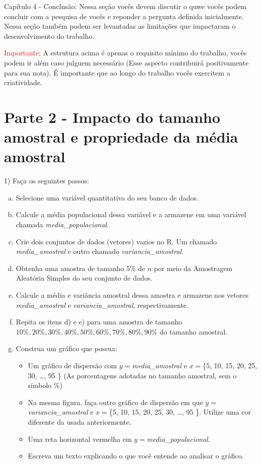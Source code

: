 \documentclass{article}
\begin{document}
Capítulo 4 - Conclusão: Nessa seção vocês devem discutir o quwe vocês podem concluir com a pesquisa de vocês e reponder a pergunta definida inicialmente. Nessa 
seção também podem ser levantadas as limitações que impactaram o desenvolvimento do trabalho. 



\textcolor{red}{Importante}: A estrutura acima é apenas o requisito mínimo do trabalho, vocês podem ir além caso julguem necessário (Esse aspecto contribuirá positivamente para sua nota).
É importante que ao longo do trabalho vocês exercitem a criatividade.


\section{Parte 2 - Impacto do tamanho amostral e propriedade da média amostral}

1) Faça os seguintes passos:
\begin{enumerate}[a)]
    \item Selecione uma variável quantitativa do seu banco de dados. 
    \item Calcule a média populacional dessa variável e a armazene em uma variável chamada \textit{media\_populacional}.
    \item Crie dois conjuntos de dados (vetores) vazios no R. Um chamado \textit{media\_amostral} e outro chamado  \textit{variancia\_amostral}.
    \item Obtenha uma amostra de tamanho $5\%$ de $n$ por meio da Amostragem Aleatória Simples do seu conjunto de dados. 
    \item Calcule a média e variância amostral dessa amostra e armazene nos vetores \textit{media\_amostral} e \textit{variancia\_amostral}, respectivamente.
    \item Repita os itens d) e e) para uma amostra de tamanho $10\%, 20\%, 30\%, 40\%, 50\%, 60\%, 70\%, 80\%, 90\%$  do 
    tamanho amostral.
    \item Construa um gráfico que possua:
    \begin{itemize}
    \item Um gráfico de dispersão com $y=$\textit{media\_amostral} e $x=$\{5, 10, 15, 20, 25, 30, \dots, 95 \} (As porcentagens adotadas no tamanho amostral, sem o símbolo \%)
    \item Na mesma figura, faça outro gráfico de dispersão em que $y=$\textit{variancia\_amostral} e $x=$\{5, 10, 15, 20, 25, 30, \dots, 95 \}. Utilize uma cor diferente da usada anteriormente. 
    \item Uma reta horizontal vermelha em $y=$\textit{media\_populacional}.
    \item Escreva um texto explicando o que você entende ao analisar o gráfico. 
    \end{itemize} 
\end{enumerate}
\end{document}
